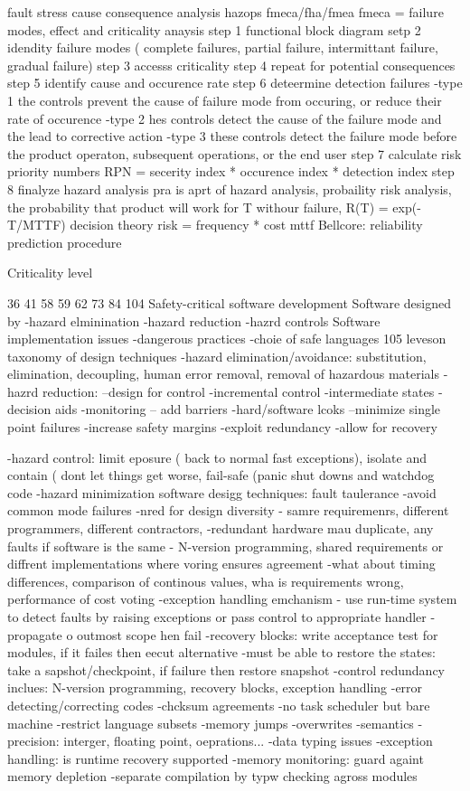 fault stress
cause consequence analysis
hazops
fmeca/fha/fmea
fmeca = failure modes, effect and criticality anaysis
step 1 functional block diagram
setp 2 idendity failure modes ( complete failures, partial failure, intermittant failure, gradual failure)
step 3 accesss criticality
step 4 repeat for potential consequences
step 5 identify cause and occurence rate
step 6 deteermine detection failures
-type 1 the controls prevent the cause of failure mode from occuring, or reduce their rate of occurence
-type 2 hes controls detect the cause of the failure mode and the lead to corrective action
-type 3 these controls detect the failure mode before the product operaton, subsequent operations, or the end user
step 7  calculate risk priority numbers
RPN = secerity index * occurence index * detection index
step 8 finalyze hazard analysis
pra is aprt of hazard analysis, probaility risk analysis, the probability that product will work for T withour failure, R(T) = exp(-T/MTTF)
decision theory
risk = frequency * cost
mttf
Bellcore: reliability prediction procedure

Criticality level

36
41
58
59
62
73
84
104 Safety-critical software development
Software designed by
-hazard elminination
-hazard reduction
-hazrd controls
Software implementation issues
-dangerous practices
-choie of safe languages
105 leveson taxonomy of design techniques
-hazard elimination/avoidance: substitution, elimination, decoupling,	human error removal, removal of hazardous materials
-hazrd reduction:
--design for control
-incremental control
-intermediate states
-decision aids
-monitoring
-- add barriers
-hard/software lcoks
--minimize single point failures
-increase safety margins
-exploit redundancy
-allow for recovery

-hazard control: limit eposure ( back to normal fast exceptions), isolate and contain ( dont let things get worse, fail-safe (panic shut downs and watchdog code
-hazard minimization
software desigg techniques: fault taulerance
-avoid common mode failures
-nred for design diversity
- samre requiremenrs, different programmers, different contractors,
-redundant hardware mau duplicate, any faults if software is the same
- N-version programming, shared requirements or diffrent implementations where voring ensures agreement
-what about timing differences, comparison of continous values, wha is requirements wrong, performance of cost voting
-exception handling emchanism
- use run-time system to detect faults by raising exceptions or pass control to appropriate handler
-propagate o outmost scope hen fail
-recovery blocks: write acceptance test for modules, if it failes then eecut alternative
-must be able to restore the states: take a sapshot/checkpoint, if failure then restore snapshot
-control redundancy inclues: N-version programming, recovery blocks, exception handling
-error detecting/correcting codes
-chcksum agreements
-no task scheduler but bare machine
-restrict language subsets
-memory jumps
-overwrites
-semantics
-precision: interger, floating point, oeprations...
-data typing issues
-exception handling: is runtime recovery supported
-memory monitoring: guard againt  memory depletion
-separate compilation by typw checking agross modules

